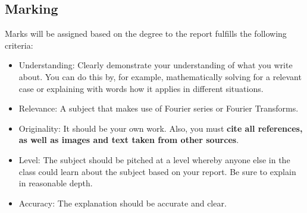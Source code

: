 \subsection{Marking}
Marks will be assigned based on the degree to the report fulfills the following criteria:
\begin{itemize}
    \item Understanding: Clearly demonstrate your understanding of what you write about. You can do this by, for example, mathematically solving for a relevant case or explaining with words how it applies in different situations.
    \item Relevance: A subject that makes use of Fourier series or Fourier Transforms.
    \item Originality: It should be your own work. Also, you must \textbf{cite all references, as well as images and text taken from other sources}.
    \item Level: The subject should be pitched at a level whereby anyone else in the class could learn about the subject based on your report. Be sure to explain in reasonable depth.
    \item Accuracy: The explanation should be accurate and clear.
\end{itemize}
